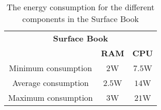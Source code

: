 \begin{table}[ht]
    \centering
    \begin{tabular}{|| c | c | c ||}
    \hline
    \multicolumn{3}{||c||}{\textbf{Surface Book}}           \\
     & \textbf{RAM}\cite{buildComputerRAM} & \textbf{CPU}   \cite{NotebookCPU} \\ [0.5ex] \hline\hline
    Minimum consumption & $2$W& $7.5$W \\ 
    Average consumption & $2.5$W& $14$W \\ 
    Maximum consumption & $3$W & $21$W \\ \hline
    \end{tabular}
    \caption{The energy consumption for the different components in the Surface Book}
    \label{tab:bookjuanEstEnergCon}    
\end{table}